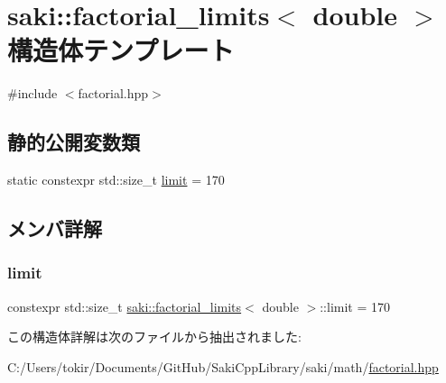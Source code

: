 \hypertarget{structsaki_1_1factorial__limits_3_01double_01_4}{}\section{saki\+:\+:factorial\+\_\+limits$<$ double $>$ 構造体テンプレート}
\label{structsaki_1_1factorial__limits_3_01double_01_4}


{\ttfamily \#include $<$factorial.\+hpp$>$}

\subsection*{静的公開変数類}
\begin{DoxyCompactItemize}
\item 
static constexpr std\+::size\+\_\+t \mbox{\hyperlink{structsaki_1_1factorial__limits_3_01double_01_4_aa23876a9fb9d9100d6aa80acf586bfdf}{limit}} = 170
\end{DoxyCompactItemize}


\subsection{メンバ詳解}
\mbox{\label{structsaki_1_1factorial__limits_3_01double_01_4_aa23876a9fb9d9100d6aa80acf586bfdf}} 
\subsubsection{\texorpdfstring{limit}{limit}}
{\footnotesize\ttfamily constexpr std\+::size\+\_\+t \mbox{\hyperlink{structsaki_1_1factorial__limits}{saki\+::factorial\+\_\+limits}}$<$ double $>$\+::limit = 170\hspace{0.3cm}{\ttfamily [static]}}



この構造体詳解は次のファイルから抽出されました\+:\begin{DoxyCompactItemize}
\item 
C\+:/\+Users/tokir/\+Documents/\+Git\+Hub/\+Saki\+Cpp\+Library/saki/math/\mbox{\hyperlink{factorial_8hpp}{factorial.\+hpp}}\end{DoxyCompactItemize}
